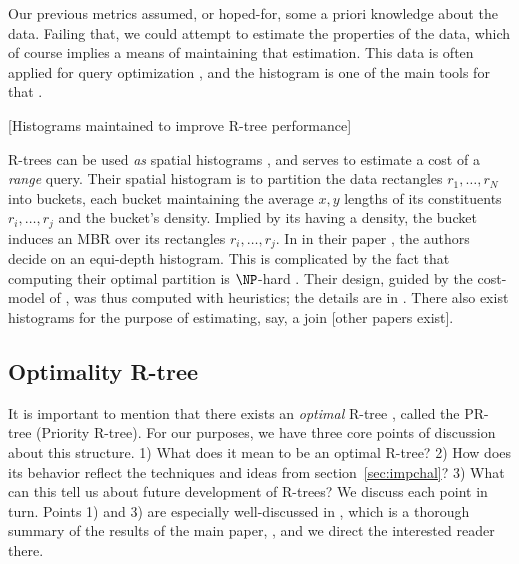 Our previous metrics assumed, or hoped-for, some a priori knowledge about the data.
Failing that, we could attempt to estimate the properties of the data, which of course implies a means of maintaining that estimation.
This data is often applied for query optimization \cite{chaudhuri98}, and the histogram is one of the main tools for that \cite{poosalahaasioannidisshekita96}.

[Histograms maintained to improve R-tree performance]

R-trees can be used \emph{as} spatial histograms \cite{achakeevseeger12}, and serves to estimate a cost of a \emph{range} query.
Their spatial histogram is to partition the data rectangles $r_1,\ldots,r_N$ into buckets, each bucket maintaining the average $x,y$ lengths of its constituents $r_i,\ldots,r_j$ and the bucket's density.
Implied by its having a density, the bucket induces an MBR over its rectangles $r_i,\ldots,r_j$.
In in their paper \cite{achakeevseeger12}, the authors decide on an equi-depth histogram.
This is complicated by the fact that computing their optimal partition is $\NP$-hard \cite{muthukrishnanpoosalasuel99}.
Their design, guided by the cost-model of \cite{theodoridissellis96}, was thus computed with heuristics; the details are in \cite{achakeevseeger12a}.
There also exist histograms for the purpose of estimating, say, a join \cite{aboulnaganaughton00} [other papers exist].

\subsection{Optimality R-tree}
It is important to mention that there exists an \emph{optimal} R-tree \cite{argeberghaverkortyi04}, called the PR-tree (Priority R-tree).
For our purposes, we have three core points of discussion about this structure.
1) What does it mean to be an optimal R-tree?
2) How does its behavior reflect the techniques and ideas from section~\ref{sec:impchal}?
3) What can this tell us about future development of R-trees?
We discuss each point in turn.
Points 1) and 3) are especially well-discussed in \cite{yi12}, which is a thorough summary of the results of the main paper, \cite{argeberghaverkortyi04}, and we direct the interested reader there.

